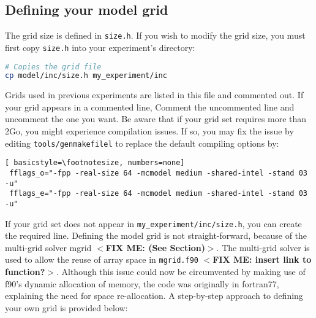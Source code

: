 \documentclass[12pt,letterpaper,titlepage]{article}
\newcommand{\fixme}[1]{\color{red}$<$\textbf{FIX ME: #1}$>$\color{black}}
\begin{document}
\subsection{Defining your model grid}

The grid size is defined in \texttt{size.h}. If you wish to modify the grid size, you must first copy \texttt{size.h} into your experiment's directory:

\begin{lstlisting}[language=sh]
# Copies the grid file
cp model/inc/size.h my_experiment/inc
\end{lstlisting}

Grids used in previous experiments are listed in this file and commented out. If your grid appears in a commented line, Comment the uncommented line and uncomment the one you want. Be aware that if your grid set requires more than 2Go, you might experience compilation issues. If so, you may fix the issue by editing \texttt{tools/genmakefilel} to replace the default compiling options by:

\begin{lstlisting}[	basicstyle=\footnotesize, numbers=none]
 fflags_o="-fpp -real-size 64 -mcmodel medium -shared-intel -stand 03 -u" 
 fflags_e="-fpp -real-size 64 -mcmodel medium -shared-intel -stand 03 -u" 
\end{lstlisting}

If your grid set does not appear in \texttt{my\_experiment/inc/size.h}, you can create the required line. Defining the model grid is not straight-forward, because of the multi-grid solver mgrid \fixme{(See Section)}. The multi-grid solver is used to allow the reuse of array space in \texttt{mgrid.f90} \fixme{insert link to function?}. Although this issue could now be circumvented by making use of f90's dynamic allocation of memory, the code was originally in fortran77, explaining the need for space re-allocation. A step-by-step approach to defining your own grid is provided below:
\end{document}
